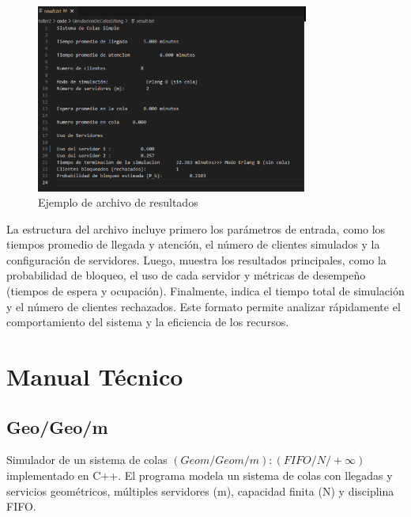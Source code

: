 \documentclass{article}
\begin{document}
\begin{figure}[H]
    \centering
    \includegraphics[width=0.8\textwidth]{images/manualUsuarioErlangBC_5.png}
    \caption{Ejemplo de archivo de resultados}
    \label{fig:resultados}
\end{figure}

La estructura del archivo incluye primero los parámetros de entrada, como los tiempos promedio de llegada y atención, el número de clientes simulados y la configuración de servidores. Luego, muestra los resultados principales, como la probabilidad de bloqueo, el uso de cada servidor y métricas de desempeño (tiempos de espera y ocupación). Finalmente, indica el tiempo total de simulación y el número de clientes rechazados. Este formato permite analizar rápidamente el comportamiento del sistema y la eficiencia de los recursos.


\section{Manual Técnico}

\subsection{Geo/Geo/m}\label{subsec:geogeo_m}

Simulador de un sistema de colas $(Geom/Geom/m):(FIFO/N/+ \infty)$ implementado en C++. El programa modela un sistema de colas con llegadas y servicios geométricos, múltiples servidores (m), capacidad finita (N) y disciplina FIFO.
\end{document}
